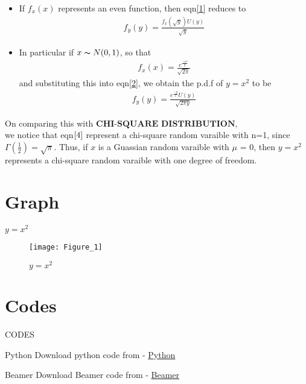 \documentclass{beamer}
\begin{document}
\begin{frame}
    \begin{itemize}
        \item If $f_x(x)$ represents an even function, then eqn\eqref{1} reduces to 
        \begin{align} \label{2}
            f_y(y)= \frac{f_x(\sqrt{y})U(y)}{\sqrt{y}}
        \end{align}

        \item In particular if $x \thicksim N(0,1)$, so that 
        \begin{align} \label{3}
            f_x(x)=\frac{e^\frac{-x^2}{2}}{\sqrt{2\pi}}
        \end{align}
        and substituting this into eqn\eqref{2}, we obtain the p.d.f of $y = x^2 $ to be 
        \begin{align} \label{4}
            f_y(y)=\frac{e^\frac{-y}{2} U(y)}{\sqrt{2\pi y}}
        \end{align}
    \end{itemize}
\end{frame}

\begin{frame}
    On comparing this with $\textbf{CHI-SQUARE DISTRIBUTION}$,\\ we notice that eqn$\eqref{4}$ represent a chi-square random varaible with n=1, since $\varGamma(\frac{1}{2}) =  \sqrt{\pi}$. Thus, if $x$ is a Guassian random varaible with $\mu$ = 0, then $y=x^2$ represents a chi-square random varaible with one degree of freedom.
\end{frame}

\section{Graph}
\begin{frame}{$y = x^2$}
    \begin{figure}[!ht]
		\centering
		\texttt{[image: Figure\_1]}
		\caption{$y = x^2$}
		\label{fig1}
	\end{figure}
\end{frame}

\section{Codes}
\begin{frame}{CODES}
    \begin{block}{Python}
         Download python code from - \href{https://github.com/jarpula-Bhanu/Assignment_9/blob/main/code/graph.py}{Python}
    \end{block}

 \begin{block}{Beamer}
         Download Beamer code from - \href{https://github.com/jarpula-Bhanu/Assignment_9/blob/main/Assignemnt_9.tex}{Beamer}
    \end{block}
\end{frame} 
\end{document}

